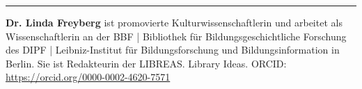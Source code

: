 \begin{center}\rule{0.5\linewidth}{0.5pt}\end{center}

\textbf{Dr. Linda Freyberg} ist promovierte Kulturwissenschaftlerin und arbeitet als Wissenschaftlerin an der BBF | Bibliothek für Bildungsgeschichtliche Forschung des DIPF | Leibniz-Institut für Bildungsforschung und Bildungsinformation in Berlin. Sie ist Redakteurin der LIBREAS. Library Ideas. ORCID: \url{https://orcid.org/0000-0002-4620-7571}